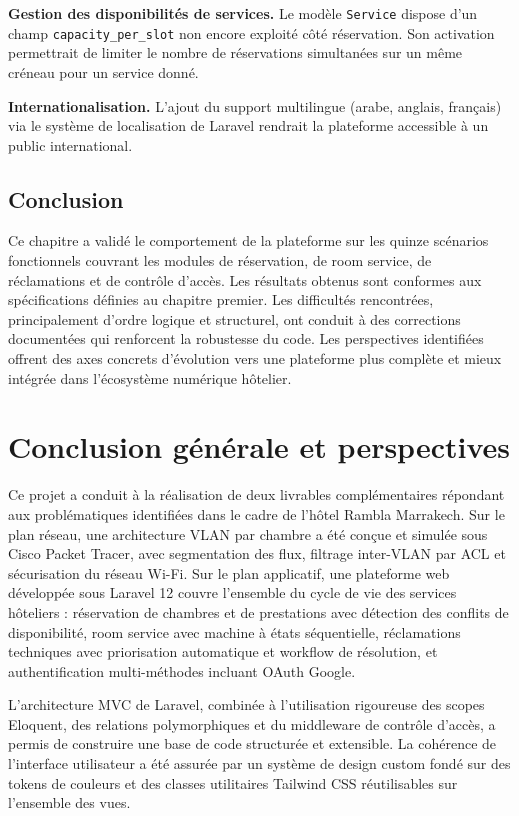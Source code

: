 \documentclass[12pt,a4paper]{report}
\begin{document}
\textbf{Gestion des disponibilités de services.} Le modèle \texttt{Service}
dispose d'un champ \texttt{capacity\_per\_slot} non encore exploité côté
réservation. Son activation permettrait de limiter le nombre de réservations
simultanées sur un même créneau pour un service donné.

\textbf{Internationalisation.} L'ajout du support multilingue (arabe,
anglais, français) via le système de localisation de Laravel rendrait la
plateforme accessible à un public international.

\section{Conclusion}

Ce chapitre a validé le comportement de la plateforme sur les quinze
scénarios fonctionnels couvrant les modules de réservation, de room service,
de réclamations et de contrôle d'accès. Les résultats obtenus sont conformes
aux spécifications définies au chapitre premier. Les difficultés rencontrées,
principalement d'ordre logique et structurel, ont conduit à des corrections
documentées qui renforcent la robustesse du code. Les perspectives
identifiées offrent des axes concrets d'évolution vers une plateforme plus
complète et mieux intégrée dans l'écosystème numérique hôtelier.

\chapter*{Conclusion générale et perspectives}

Ce projet a conduit à la réalisation de deux livrables complémentaires
répondant aux problématiques identifiées dans le cadre de l'hôtel Rambla
Marrakech. Sur le plan réseau, une architecture VLAN par chambre a été
conçue et simulée sous Cisco Packet Tracer, avec segmentation des flux,
filtrage inter-VLAN par ACL et sécurisation du réseau Wi-Fi. Sur le plan
applicatif, une plateforme web développée sous Laravel 12 couvre l'ensemble
du cycle de vie des services hôteliers : réservation de chambres et de
prestations avec détection des conflits de disponibilité, room service avec
machine à états séquentielle, réclamations techniques avec priorisation
automatique et workflow de résolution, et authentification multi-méthodes
incluant OAuth Google.

L'architecture MVC de Laravel, combinée à l'utilisation rigoureuse des
scopes Eloquent, des relations polymorphiques et du middleware de contrôle
d'accès, a permis de construire une base de code structurée et extensible.
La cohérence de l'interface utilisateur a été assurée par un système de
design custom fondé sur des tokens de couleurs et des classes utilitaires
Tailwind CSS réutilisables sur l'ensemble des vues.
\end{document}
